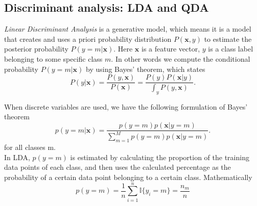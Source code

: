     

    \newpage
    \subsection{Discriminant analysis: LDA and QDA}
    
    \emph{Linear Discriminant Analysis} is a generative model, which means it is a model that creates and uses a  priori probability 
    distribution $P(\mathbf{x}, y)$ to estimate the posterior probability $P(y=m|\mathbf{x})$.  Here $\mathbf{x}$ is a feature vector,  $y$ is a class label belonging to some specific class $m$. In other words we compute the conditional probability $P(y=m|\mathbf{x})$ by using  Bayes' theorem, which states
        \begin{equation*}
            P(y|\mathbf{x}) = \frac{P(y,\mathbf{x})}{P(\mathbf{x})} = \frac{P(y)P(\mathbf{x}|y)}{\int_y P(y,\mathbf{x})}.
        \end{equation*}
        
    When discrete variables are used, we have the following formulation of Bayes' theorem 
    \begin{equation*}
        p(y=m|\mathbf{x}) = \frac{p(y=m)p(\mathbf{x}|y=m)}{\sum_{m=1}^{M} p(y=m) p(\mathbf{x}|y=m)}.
    \end{equation*}
    for all classes m. 
    \\
    
    In LDA, $p(y=m)$ is estimated by calculating the proportion of the training data points of each class,  and then uses the calculated percentage as the probability of a certain data point belonging to a certain class. Mathematically
        \begin{equation*}
            p(y=m) = \frac{1}{n}\sum_{i=1}^{n}\mathbb{I}\{y_i=m\} = \frac{n_m}{n}
        \end{equation*}  

